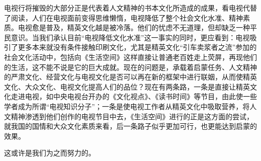 电视行将摧毁的大部分正是代表着人文精神的书本文化所造成的成果，看电视代替了阅读，人们在电视面前变得思维懒惰，电视降低了整个社会文化水准、精神素质。电视愈是普及，精英文化越是被冷落。他们的忧虑不无道理，但却缺乏一种平民意识。当我们承认目前“电视降低文化水准”这一事实的同时，更应看到：电视吸引了更多本来就没有条件接触印刷文化，尤其是精英文化“引车卖浆者之流”参加的社会文化活动中，包括向《生活空间》这样直接让普通老百姓走上荧屏，再现他们的生活，这不能不说是它的巨大成就。现在的问题是，承载着启蒙任务、人文精神的严肃文化、经营文化与电视文化是否可以再在新的框架中进行联姻，从而使精英文化、大众文化、电视文化提高人们的品位？现在有两条路，一条是直接让精英文化走进电视，如中央电视台开办的《文化视点》、《读书时间》等节目，由此使一些学者成为所谓“电视知识分子”；一条是使电视工作者从精英文化中吸取营养，将人文精神渗透到他们创作的电视节目中去，《生活空间》进行的正是这方面的尝试，就我国的国情和大众文化素质来看，后一条路子似乎更加可行，也更能达到启蒙的效果。

这或许是我们为之而努力的。



\clearpage

